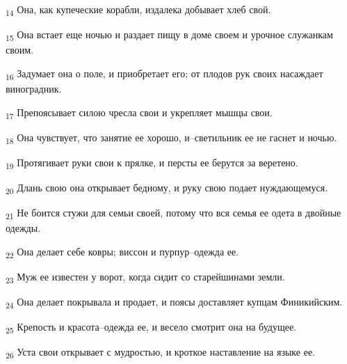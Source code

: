 \begin{tcolorbox}
\textsubscript{14} Она, как купеческие корабли, издалека добывает хлеб свой.
\end{tcolorbox}
\begin{tcolorbox}
\textsubscript{15} Она встает еще ночью и раздает пищу в доме своем и урочное служанкам своим.
\end{tcolorbox}
\begin{tcolorbox}
\textsubscript{16} Задумает она о поле, и приобретает его; от плодов рук своих насаждает виноградник.
\end{tcolorbox}
\begin{tcolorbox}
\textsubscript{17} Препоясывает силою чресла свои и укрепляет мышцы свои.
\end{tcolorbox}
\begin{tcolorbox}
\textsubscript{18} Она чувствует, что занятие ее хорошо, и--светильник ее не гаснет и ночью.
\end{tcolorbox}
\begin{tcolorbox}
\textsubscript{19} Протягивает руки свои к прялке, и персты ее берутся за веретено.
\end{tcolorbox}
\begin{tcolorbox}
\textsubscript{20} Длань свою она открывает бедному, и руку свою подает нуждающемуся.
\end{tcolorbox}
\begin{tcolorbox}
\textsubscript{21} Не боится стужи для семьи своей, потому что вся семья ее одета в двойные одежды.
\end{tcolorbox}
\begin{tcolorbox}
\textsubscript{22} Она делает себе ковры; виссон и пурпур--одежда ее.
\end{tcolorbox}
\begin{tcolorbox}
\textsubscript{23} Муж ее известен у ворот, когда сидит со старейшинами земли.
\end{tcolorbox}
\begin{tcolorbox}
\textsubscript{24} Она делает покрывала и продает, и поясы доставляет купцам Финикийским.
\end{tcolorbox}
\begin{tcolorbox}
\textsubscript{25} Крепость и красота--одежда ее, и весело смотрит она на будущее.
\end{tcolorbox}
\begin{tcolorbox}
\textsubscript{26} Уста свои открывает с мудростью, и кроткое наставление на языке ее.
\end{tcolorbox}
